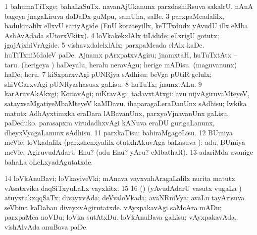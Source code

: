 {{{{{{\begin{center}
\noindent
\gl{\pagu}
\expl{}
\bmng
\bnum
\num{1}  bahumaTiTxge; bahaLaSuTx. 
  
\banum
{} navanAjUkanunx parxdashiRsuva sakalrU. 
 nAnA bageya jnagaLiruva doDaDx guMpu, samUha, saBe. 
\eanum
\numie
\num{3}  parxpaMcadalilx, badukinalilx ellxvU sariyAgide (EnU korateyillx, keTTxdudx yAvudU illx eMba AshAvAdada sUtorxVkitx). 
\num{4}  loVkakekxlAlx tiLidide; ellxrigU gotutx; jgajAjxhiVrAgide. 
\num{5}  vishavxdalelxlAlx; parxpaMcada elAlx kaDe. 
  
\banum
{} huTiTxniMdaleV paDe; Ajnamx pArxpatxvAgiru; jnamxtaH, huTuTxtAtx -- taru. 
 (herigeya \vi) haDeyalu, heralu neravAgu; herige mADisu. 
 (maguvanunx) haDe; heru. 
\eanum
\numie
\num{7}  kiSxparxvAgi pUNRjya sAdhisu; beVga pUtiR gelulx; shiVGarxvAgi pUNRyashasusx gaLisu. 
\num{8}  huTuTx; jnamxtALu. 
\num{9}  karAruvAkAkxgi; KcitavAgi; niKravAgi; tadavxtAtxgi:  avu nijvAgiruvaMteyeV, satayxsaMgatiyeMbaMteyeV kaMDavu. 
  
\banum
{} ihaparagaLeraDanUnx sAdhisu; lwkika matutx AdhAyxtimxka eraDara lABavanUnx, parxyoVjnavanUnx gaLisu, paDeduko. 
 parasapxra virudadhxvAgi kANuva eraDU gurigaLanunx, dheyxVyagaLanunx sAdhisu. 
\eanum
\numie
\num{11}  parxkaTisu; bahiraMgagoLisu. 
\num{12}  BUmiya meVle; loVkadalilx (parxshenxyalilx otutxhAkuvAga baLasuva \pagu):  adu, BUmiya meVle, AgiruvudAdarU Enu? (adu Enu? yAru? eMbathaR). 
\num{13}  adariMda avanige bahaLa oLeLxyadAgutatxde. 
\num{14}  loVkAnuBavi; loVkaviveVki; mAnava vayxvahAragaLalilx nurita matutx vAsatxvika daqSiTxyuLaLx vayxkitx. 
\num{15}  
\num{16}  (\AmA) (yAvudAdarU vasutx \mo vugaLa \vi) atuyxtakxqqSaTx; divayxvAda; deVvaloVkada; avaNRniVya:  avaLu tayArisuva seVbina kaDabau divayxvAgirutatxde. 
  
\banum
{} vAyxpakavAgi saMcAra mADu; parxpaMca noVDu; loVka sutAtxDu. 
 loVkAnuBava gaLisu; vAyxpakavAda, vishAlvAda anuBava paDe. 

\end{center}}}}}}}
